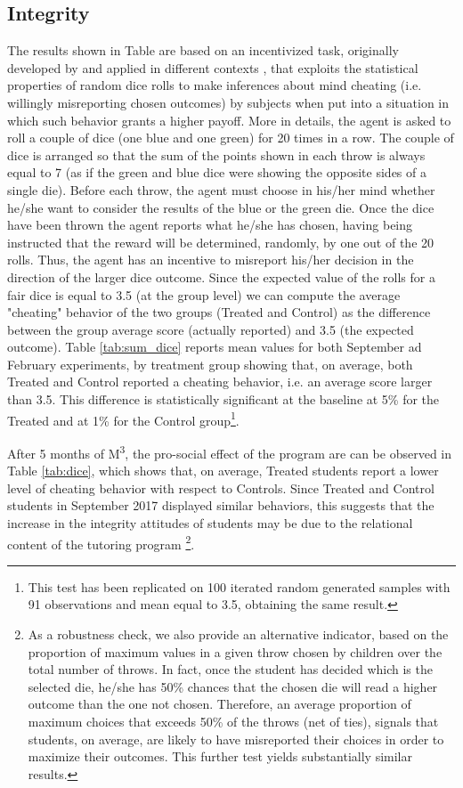 \documentclass[ 12 pt]{article}
\begin{document}
\subsection{Integrity}
The results shown in Table \label{tab:dice} are based on an incentivized task, originally developed by \citep{fischbacher2013lies} and applied in different contexts \citep[e.g.][]{ariely2015}, that exploits the statistical properties of random dice rolls to make inferences about mind cheating (i.e. willingly misreporting chosen outcomes) by subjects when put into a situation in which such behavior grants a higher payoff. 
More in details, the agent is asked to roll a couple of dice (one blue and one green) for 20 times in a row. The couple of dice is arranged so that the sum of the points shown in each throw is always equal to 7 (as if the green and blue dice were showing the opposite sides of a single die). Before each throw, the agent must choose in his/her mind whether he/she want to consider the results of the blue or the green die. Once the dice have been thrown the agent reports what he/she has chosen, having being instructed that the reward will be determined, randomly, by one out of the 20 rolls. Thus, the agent has an incentive to misreport his/her decision in the direction of the larger dice outcome. Since the expected value of the rolls for a fair dice is equal to 3.5 (at the group level) we can compute the average "cheating" behavior of the two groups (Treated and Control) as the difference between the group average score (actually reported) and 3.5 (the expected outcome). Table \ref{tab:sum_dice} reports mean values for both September ad February experiments, by treatment group showing that, on average, both Treated and Control reported a cheating behavior, i.e. an average score larger than 3.5. This difference is statistically significant at the baseline at 5\% for the Treated and at 1\% for the Control group\footnote{This test has been replicated on 100 iterated random generated samples with 91 observations and mean equal to 3.5, obtaining the same result.}.



After 5 months of M\textsuperscript{3}, the pro-social effect of the program are can be observed in Table \ref{tab:dice}, which shows that, on average, Treated students report a lower level of cheating behavior with respect to Controls. Since Treated and Control students in September 2017 displayed similar behaviors, this suggests that the increase in the integrity attitudes of students may be due to the relational content of the tutoring program \footnote{As a robustness check, we also provide an alternative indicator, based on the proportion of maximum values in a given throw chosen by children over the total number of throws. In fact, once the student has decided which is the selected die, he/she has 50\% chances that the chosen die will read a higher outcome than the one not chosen. Therefore, an average proportion of maximum choices that exceeds 50\% of the throws (net of ties), signals that students, on average, are likely to have misreported their choices in order to maximize their outcomes. This further test yields substantially similar results.}. 
\end{document}
